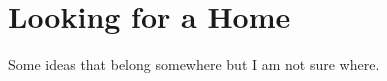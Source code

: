 \chapter{Looking for a Home}
\label{app:LookingForaHome}

Some ideas that belong somewhere but I am not sure where.


